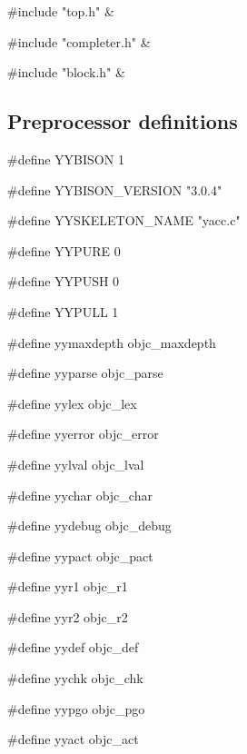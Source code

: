 \medskip
\begin{cxreftabi}
{\stt \#include "top.h"} &\\
\end{cxreftabi}

\medskip
\begin{cxreftabi}
{\stt \#include "completer.h"} &\\
\end{cxreftabi}

\medskip
\begin{cxreftabi}
{\stt \#include "block.h"} &\\
\end{cxreftabi}


\subsection*{Preprocessor definitions}

{\stt \#define YYBISON 1}

\medskip
{\stt \#define YYBISON\_VERSION "3.0.4"}

\medskip
{\stt \#define YYSKELETON\_NAME "yacc.c"}

\medskip
{\stt \#define YYPURE 0}

\medskip
{\stt \#define YYPUSH 0}

\medskip
{\stt \#define YYPULL 1}

\medskip
{\stt \#define yymaxdepth objc\_maxdepth}

\medskip
{\stt \#define yyparse objc\_parse}

\medskip
{\stt \#define yylex objc\_lex}

\medskip
{\stt \#define yyerror objc\_error}

\medskip
{\stt \#define yylval objc\_lval}

\medskip
{\stt \#define yychar objc\_char}

\medskip
{\stt \#define yydebug objc\_debug}

\medskip
{\stt \#define yypact objc\_pact}

\medskip
{\stt \#define yyr1 objc\_r1}

\medskip
{\stt \#define yyr2 objc\_r2}

\medskip
{\stt \#define yydef objc\_def}

\medskip
{\stt \#define yychk objc\_chk}

\medskip
{\stt \#define yypgo objc\_pgo}

\medskip
{\stt \#define yyact objc\_act}

